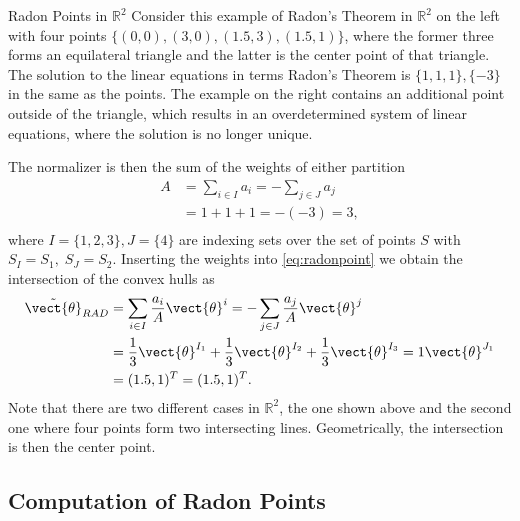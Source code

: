 \begin{example}{Radon Points in $\mathbb{R}^2$}
    \label{ex:radon}
    Consider this example of Radon's Theorem in $\mathbb{R}^2$ on the left with four points $\{(0,0), (3,0), (1.5, 3), (1.5,1)\}$, where the former three forms an equilateral triangle and the latter is the center point of that triangle.
    The solution to the linear equations in terms Radon's Theorem is $\{1,1,1\},\{-3\}$ in the same as the points. 
    The example on the right contains an additional point outside of the triangle, which results in an overdetermined system of linear equations, where the solution is no longer unique.
    
     
    The normalizer is then the sum of the weights of either partition
    \begin{equation}
        \begin{split}
            A &= \sum_{i\in I} a_i = - \sum_{j \in J} a_j \\
            &= 1 + 1 + 1 = -(-3) = 3, \\
        \end{split}
    \end{equation}
    where $I=\{1,2,3\},J=\{4\}$ are indexing sets over the set of points $S$ with $S_I = S_1,\; S_J = S_2$.
    Inserting the weights into \autoref{eq:radonpoint} we obtain the intersection of the convex hulls as
    \begin{equation}
        \begin{split}
            \tilde{\vect{\theta}}_{RAD} &= \sum_{i\in I} \frac{a_i}{A} \vect{\theta}^i = - \sum_{j \in J} \frac{a_j}{A} \vect{\theta}^j \\
            &= \frac{1}{3} \vect{\theta}^{I_1} + \frac{1}{3} \vect{\theta}^{I_2} + \frac{1}{3} \vect{\theta}^{I_3} = 1 \vect{\theta}^{J_1} \\
            & =  (1.5, 1)^T = (1.5, 1)^T.
        \end{split}
    \end{equation}
    Note that there are two different cases in $\mathbb{R}^2$, the one shown above and the second one where four points form two intersecting lines. Geometrically, the intersection is then the center point.

\end{example}
   

\subsection{Computation of Radon Points}


